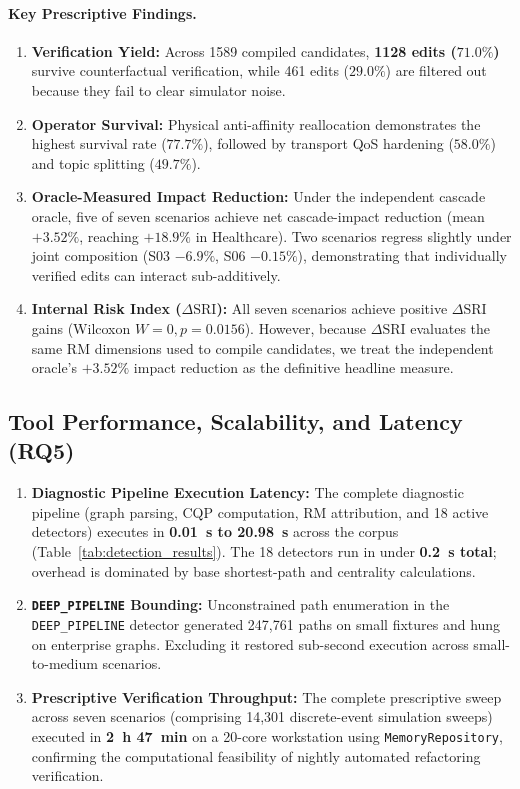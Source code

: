 \paragraph{Key Prescriptive Findings.}
\begin{enumerate}
    \item \textbf{Verification Yield:} Across 1589 compiled candidates, \textbf{1128 edits ($71.0\%$)} survive counterfactual verification, while 461 edits ($29.0\%$) are filtered out because they fail to clear simulator noise.
    \item \textbf{Operator Survival:} Physical anti-affinity reallocation demonstrates the highest survival rate ($77.7\%$), followed by transport QoS hardening ($58.0\%$) and topic splitting ($49.7\%$).
    \item \textbf{Oracle-Measured Impact Reduction:} Under the independent cascade oracle, five of seven scenarios achieve net cascade-impact reduction (mean $+3.52\%$, reaching $+18.9\%$ in Healthcare). Two scenarios regress slightly under joint composition (S03 $-6.9\%$, S06 $-0.15\%$), demonstrating that individually verified edits can interact sub-additively.
    \item \textbf{Internal Risk Index ($\Delta\mathrm{SRI}$):} All seven scenarios achieve positive $\Delta\mathrm{SRI}$ gains (Wilcoxon $W=0, p=0.0156$). However, because $\Delta\mathrm{SRI}$ evaluates the same RM dimensions used to compile candidates, we treat the independent oracle's $+3.52\%$ impact reduction as the definitive headline measure.
\end{enumerate}

\subsection{Tool Performance, Scalability, and Latency (RQ5)}
\label{sec:results:performance}

\begin{enumerate}
    \item \textbf{Diagnostic Pipeline Execution Latency:} The complete diagnostic pipeline (graph parsing, CQP computation, RM attribution, and 18 active detectors) executes in \textbf{0.01~s to 20.98~s} across the corpus (Table~\ref{tab:detection_results}). The 18 detectors run in under \textbf{0.2~s total}; overhead is dominated by base shortest-path and centrality calculations.
    \item \textbf{\texttt{DEEP\_PIPELINE} Bounding:} Unconstrained path enumeration in the \texttt{DEEP\_PIPELINE} detector generated 247,761 paths on small fixtures and hung on enterprise graphs. Excluding it restored sub-second execution across small-to-medium scenarios.
    \item \textbf{Prescriptive Verification Throughput:} The complete prescriptive sweep across seven scenarios (comprising 14,301 discrete-event simulation sweeps) executed in \textbf{2~h 47~min} on a 20-core workstation using \texttt{MemoryRepository}, confirming the computational feasibility of nightly automated refactoring verification.
\end{enumerate}
